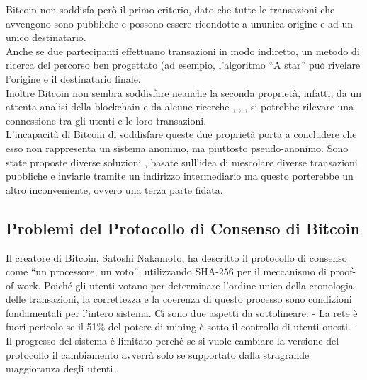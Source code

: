 Bitcoin non soddisfa però il primo criterio, dato che tutte le
transazioni che avvengono sono pubbliche e possono essere ricondotte a
un\textquotesingle unica origine e ad un unico destinatario.\\
Anche se due partecipanti effettuano transazioni in modo indiretto, un
metodo di ricerca del percorso ben progettato (ad esempio, l'algoritmo
``A star'' \cite{hart1968formal} può rivelare l'origine e il destinatario
finale.\\
Inoltre Bitcoin non sembra soddisfare neanche la seconda proprietà,
infatti, da un attenta analisi della blockchain e da alcune ricerche
\cite{reid2013analysis}, \cite{analysis_bitcoin}, \cite{ron2013quantitative}, si potrebbe rilevare una
connessione tra gli utenti e le loro transazioni.\\
L'incapacità di Bitcoin di soddisfare queste due proprietà porta a
concludere che esso non rappresenta un sistema anonimo, ma piuttosto
pseudo-anonimo. Sono state proposte diverse soluzioni \cite{mixing_services},
\cite{secure_multiparty} basate sull'idea di mescolare diverse transazioni pubbliche
e inviarle tramite un indirizzo intermediario ma questo porterebbe un
altro inconveniente, ovvero una terza parte fidata.

\subsection{Problemi del Protocollo di Consenso di
Bitcoin}\label{problemi-del-protocollo-di-consenso-di-bitcoin}

Il creatore di Bitcoin, Satoshi Nakamoto, ha descritto il protocollo di
consenso come ``un processore, un voto'', utilizzando SHA-256 per il
meccanismo di proof-of-work. Poiché gli utenti votano per determinare
l'ordine unico della cronologia delle transazioni, la correttezza e la
coerenza di questo processo sono condizioni fondamentali per l'intero
sistema. Ci sono due aspetti da sottolineare: - La rete è fuori pericolo
se il 51\% del potere di mining è sotto il controllo di utenti onesti. -
Il progresso del sistema è limitato perché se si vuole cambiare la
versione del protocollo il cambiamento avverrà solo se supportato dalla
stragrande maggioranza degli utenti \cite{bip_34}.

